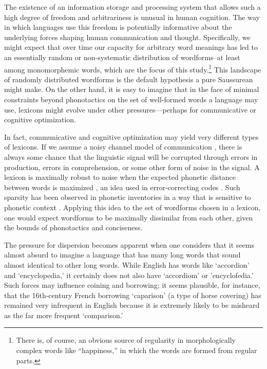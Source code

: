 \documentclass{article}
\begin{document}
The existence of an information storage and processing system that allows such a high degree of freedom and
arbitrariness is unusual in human cognition. The way in which languages use this freedom is potentially
informative about the underlying forces shaping human communication and thought. Specifically, we might expect
that over time our capacity for arbitrary word meanings has led to an essentially random or non-systematic
distribution of wordforms--at least among monomorphemic words, which are the focus of this
study.\footnote{There is, of course, an obvious source of regularity in morphologically complex words like
``happiness,'' in which the words are formed from regular parts.} This landscape of randomly distributed
wordforms is the default hypothesis a pure Saussurean might make. On the other hand, it is easy to imagine
that in the face of minimal constraints beyond phonotactics on the set of well-formed words a language may
use, lexicons might evolve under other pressures---perhaps for communicative or cognitive optimization.

In fact, communicative and cognitive optimization may yield very different types of lexicons. If we assume a
noisy channel model of communication \citep{shannon_mathematical_2001,
levy_expectation-based_2008,gibson2013noisy}, there is always some chance that the linguistic signal will be
corrupted through errors in production, errors in comprehension, or some other form of noise in the signal. A
lexicon is maximally robust to noise when the expected phonetic distance between words is maximized
\citep{flemming_contrast_2004, graff_2012}, an idea used in error-correcting codes
\citep{shannon1948mathematical}. Such sparsity has been observed in phonetic inventories
\citep{hockett1955manual,flemming2002auditory} in a way that is sensitive to phonetic context
\citep{steriade1997phonetics,steriade2001directional}. Applying this idea to the set of wordforms chosen in a
lexicon, one would expect wordforms to be maximally dissimilar from each other, given the bounds of
phonotactics and conciseness.

The pressure for dispersion becomes apparent when one considers that it seems almost absurd to imagine a
language that has many long words that sound almost identical to other long words. While English has words
like `accordion' and `encyclopedia,' it certainly does not also have `accordiom' or 'encyclofedia.' Such
forces may influence coining and borrowing; it seems plausible, for instance, that the 16th-century French
borrowing `caparison' (a type of horse covering) has remained very infrequent in English because it is
extremely likely to be misheard as the far more frequent `comparison.'
\end{document}
